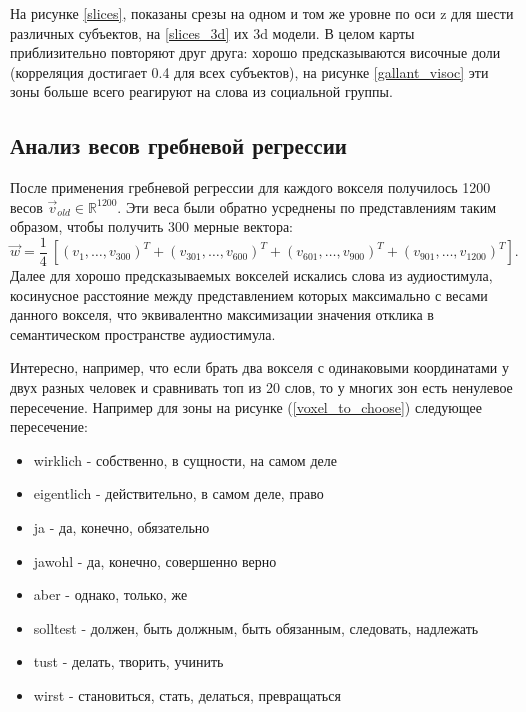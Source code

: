 \documentclass[pdftex,ptm,12pt,a4paper]{report}
\theoremstyle{definition}
\begin{document}
На рисунке \ref{slices},  показаны срезы на одном и том же уровне по оси z  для шести различных субъектов, на \ref{slices_3d} их 3d модели. В целом карты приблизительно повторяют друг друга: хорошо предсказываются височные доли (корреляция достигает 0.4 для всех субъектов), на рисунке \ref{gallant_visoc} эти зоны больше всего реагируют на слова из социальной группы.


\subsection{Анализ весов гребневой регрессии}
После применения гребневой регрессии для каждого вокселя получилось 1200 весов $\vec{v}_{old} \in \mathbb{R}^{1200}$. Эти веса были обратно усреднены по представлениям таким образом, чтобы получить 300 мерные вектора:
$$\vec{w} = \frac{1}{4}\ [(v_1, \ldots, v_{300})^{T} + (v_{301}, \ldots, v_{600})^{T} + (v_{601}, \ldots, v_{900})^{T} + (v_{901}, \ldots, v_{1200})^{T}].$$
Далее для хорошо предсказываемых вокселей искались слова из аудиостимула, косинусное расстояние между представлением которых максимально с весами данного вокселя, что эквивалентно максимизации значения отклика в семантическом пространстве аудиостимула.

Интересно, например, что если брать два вокселя с одинаковыми координатами у двух разных человек и сравнивать топ из 20 слов, то у многих зон есть ненулевое пересечение. Например для зоны на рисунке (\ref{voxel_to_choose}) следующее  пересечение:

\begin{itemize}
\item wirklich - собственно, в сущности, на самом деле
\item eigentlich - действительно, в самом деле, право
\item ja - да, конечно, обязательно
\item jawohl -  да, конечно, совершенно верно
\item aber - однако, только, же
\item solltest - должен, быть должным, быть обязанным, следовать, надлежать
\item tust - делать, творить, учинить
\item wirst - становиться, стать, делаться, превращаться
\end{itemize}
\end{document}
